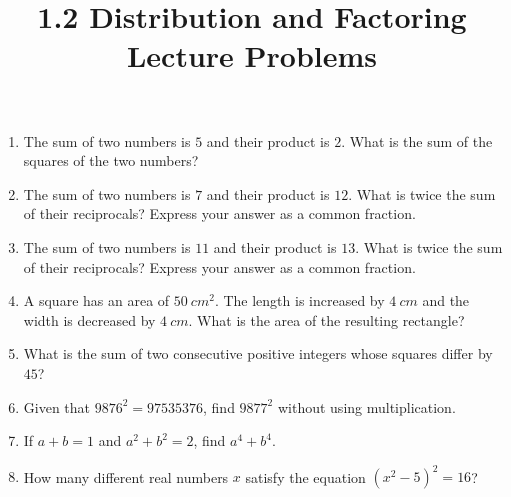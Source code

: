 \documentclass{article}
\title{1.2 Distribution and Factoring Lecture Problems}
\author{}
\date{}
\begin{document}
\maketitle
\begin{enumerate}
    \item The sum of two numbers is $5$ and their product is $2$.
        What is the sum of the squares of the two numbers?
        \vspace{3cm}
    \item The sum of two numbers is $7$ and their product is $12$.
        What is twice the sum of their reciprocals?
        Express your answer as a common fraction.
        \vspace{3cm}
    \item The sum of two numbers is $11$ and their product is $13$.
        What is twice the sum of their reciprocals?
        Express your answer as a common fraction.
        \vspace{3cm}
    \item A square has an area of $\SI{50}{cm^2}$.
        The length is increased by $\SI{4}{cm}$ and the width is decreased by $\SI{4}{cm}$.
        What is the area of the resulting rectangle?
        \vspace{3cm}
    \item What is the sum of two consecutive positive integers whose squares differ by $45$?
        \vspace{3cm}
    \item Given that $9876^2 = 97535376$, find $9877^2$ without using multiplication.
        \vspace{3cm}
    \item If $a + b = 1$ and $a^2 + b^2 = 2$, find $a^4 + b^4$.
        \vspace{3cm}
    \item How many different real numbers $x$ satisfy the equation $\left(x^2 - 5\right)^2 = 16$?
        \vspace{3cm}
\end{enumerate}
\end{document}

